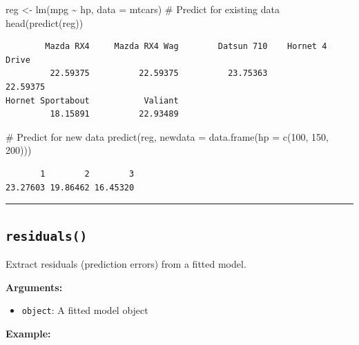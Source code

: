 \documentclass[
  letterpaper,
  DIV=11,
  numbers=noendperiod]{scrreprt}
\newenvironment{Shaded}{\begin{snugshade}}{\end{snugshade}}
\newcommand{\AttributeTok}[1]{\textcolor[rgb]{0.40,0.45,0.13}{#1}}
\newcommand{\CommentTok}[1]{\textcolor[rgb]{0.37,0.37,0.37}{#1}}
\newcommand{\DecValTok}[1]{\textcolor[rgb]{0.68,0.00,0.00}{#1}}
\newcommand{\FunctionTok}[1]{\textcolor[rgb]{0.28,0.35,0.67}{#1}}
\newcommand{\NormalTok}[1]{\textcolor[rgb]{0.00,0.23,0.31}{#1}}
\newcommand{\OtherTok}[1]{\textcolor[rgb]{0.00,0.23,0.31}{#1}}
\newcommand{\SpecialCharTok}[1]{\textcolor[rgb]{0.37,0.37,0.37}{#1}}
\providecommand{\tightlist}{%
  \setlength{\itemsep}{0pt}\setlength{\parskip}{0pt}}
\begin{document}
\begin{Shaded}
\begin{Highlighting}[]
\NormalTok{reg }\OtherTok{\textless{}{-}} \FunctionTok{lm}\NormalTok{(mpg }\SpecialCharTok{\textasciitilde{}}\NormalTok{ hp, }\AttributeTok{data =}\NormalTok{ mtcars)}
\CommentTok{\# Predict for existing data}
\FunctionTok{head}\NormalTok{(}\FunctionTok{predict}\NormalTok{(reg))}
\end{Highlighting}
\end{Shaded}

\begin{verbatim}
        Mazda RX4     Mazda RX4 Wag        Datsun 710    Hornet 4 Drive 
         22.59375          22.59375          23.75363          22.59375 
Hornet Sportabout           Valiant 
         18.15891          22.93489 
\end{verbatim}

\begin{Shaded}
\begin{Highlighting}[]
\CommentTok{\# Predict for new data}
\FunctionTok{predict}\NormalTok{(reg, }\AttributeTok{newdata =} \FunctionTok{data.frame}\NormalTok{(}\AttributeTok{hp =} \FunctionTok{c}\NormalTok{(}\DecValTok{100}\NormalTok{, }\DecValTok{150}\NormalTok{, }\DecValTok{200}\NormalTok{)))}
\end{Highlighting}
\end{Shaded}

\begin{verbatim}
       1        2        3 
23.27603 19.86462 16.45320 
\end{verbatim}

\begin{center}\rule{0.5\linewidth}{0.5pt}\end{center}

\subsection{\texorpdfstring{\texttt{residuals()}}{residuals()}}\label{residuals}

Extract residuals (prediction errors) from a fitted model.

\textbf{Arguments:}

\begin{itemize}
\tightlist
\item
  \texttt{object}: A fitted model object
\end{itemize}

\textbf{Example:}
\end{document}

